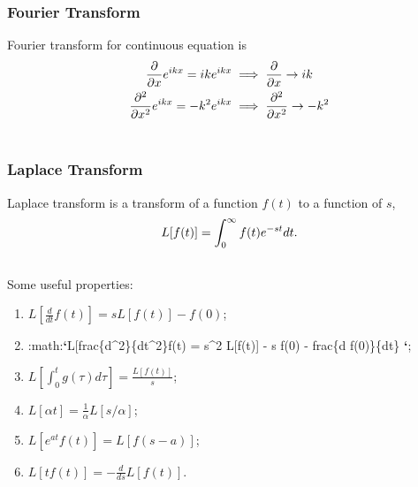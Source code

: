 \documentclass[letterpaper,10pt,english]{sphinxmanual}
\begin{document}
\subsubsection{Fourier Transform}
\label{vocabulary/vocabulary:fourier-transform}
Fourier transform for continuous equation is
\begin{gather}
\begin{split}\frac{\partial}{\partial x} e^{ikx}=ike^{ikx} &\implies \frac{\partial}{\partial x} \to ik \\
\frac{\partial^2}{\partial x^2} e^{ikx} = -k^2 e^{ikx} & \implies \frac{\partial^2}{\partial x^2} \to -k^2\end{split}\notag\\\begin{split}\end{split}\notag
\end{gather}

\subsubsection{Laplace Transform}
\label{vocabulary/vocabulary:laplace-transform}
Laplace transform is a transform of a function $f(t)$ to a function of $s$,
\begin{gather}
\begin{split}L[f(t)] = \int_0^\infty f(t) e^{ - s t} dt .\end{split}\notag\\\begin{split}\end{split}\notag
\end{gather}
Some useful properties:
\begin{enumerate}
\item {} 
$L[\frac{d}{dt}f(t)] = s L[f(t)] - f(0)$;

\item {} 
:math:{\color{red}\bfseries{}{}`}L{[}frac\{d\textasciicircum{}2\}\{dt\textasciicircum{}2\}f(t) = s\textasciicircum{}2 L{[}f(t){]} - s f(0) - frac\{d f(0)\}\{dt\} {\color{red}\bfseries{}{}`};

\item {} 
$L[\int_0^t g(\tau) d\tau ] = \frac{L[f(t)]}{s}$;

\item {} 
$L[\alpha t] = \frac{1}{\alpha} L[s/\alpha]$;

\item {} 
$L[e^{at}f(t)] = L[f(s-a)]$;

\item {} 
$L[tf(t)] = - \frac{d}{ds} L[f(t)]$.

\end{enumerate}
\end{document}
